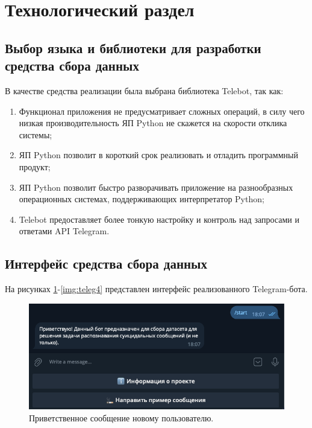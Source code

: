 \section{Технологический раздел}

\subsection{Выбор языка и библиотеки для разработки средства сбора данных}

В качестве средства реализации была выбрана библиотека Telebot, так как:

\begin{enumerate}
	\item[1.] Функционал приложения не предусматривает сложных операций, в силу чего низкая производительность ЯП Python не скажется на скорости отклика системы;
	\item[2.] ЯП Python позволит в короткий срок реализовать и отладить программный продукт;
	\item[3.] ЯП Python позволит быстро разворачивать приложение на разнообразных операционных системах, поддерживающих интерпретатор Python;
	\item[4.] Telebot предоставляет более тонкую настройку и контроль над запросами и ответами API Telegram.
\end{enumerate}

\subsection{Интерфейс средства сбора данных}

На рисунках \ref{img:teleg1}-\ref{img:teleg4} представлен интерфейс реализованного Telegram-бота.

\begin{figure}[H]
	\centering
	\includegraphics[width=\textwidth]{inc/teleg1.png}
	\caption{ Приветственное сообщение новому пользователю. }
	\label{img:teleg1}
\end{figure}


